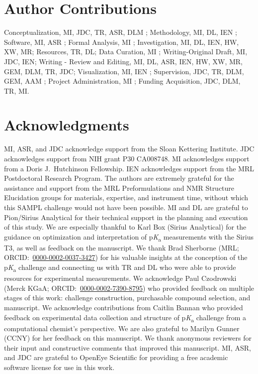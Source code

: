 \documentclass[9pt,lineno]{elife}
\newcommand{\pKa}{p\textit{K}\textsubscript{a}}
\begin{document}
\section{Author Contributions}

Conceptualization, MI, JDC, TR, ASR, DLM  ; Methodology, MI, DL, IEN ; Software, MI, ASR ; Formal Analysis, MI ; Investigation, MI, DL, IEN, HW, XW, MR; Resources, TR, DL;  Data Curation, MI ; Writing-Original Draft, MI, JDC, IEN; Writing - Review and Editing, MI, DL, ASR, IEN, HW, XW, MR, GEM, DLM, TR, JDC; Visualization, MI, IEN ; Supervision, JDC, TR, DLM, GEM, AAM ; Project Administration, MI ; Funding Acquisition, JDC, DLM, TR, MI. 


\section{Acknowledgments}

MI, ASR, and JDC acknowledge support from the Sloan Kettering Institute.
JDC acknowledges support from NIH grant P30 CA008748. 
MI acknowledges support from a Doris J.\ Hutchinson Fellowship. 
IEN acknowledges support from the MRL Postdoctoral Research Program.
The authors are extremely grateful for the assistance and support from the MRL Preformulations and NMR Structure Elucidation groups for materials, expertise, and instrument time, without which this SAMPL challenge would not have been possible.
MI and DL are grateful to Pion/Sirius Analytical for their technical support in the planning and execution of this study. 
We are especially thankful to Karl Box (Sirius Analytical) for the guidance on optimization and interpretation of \pKa{} measurements with the Sirius T3, as well as feedback on the manuscript. 
We thank Brad Sherborne (MRL; ORCID:~\href{https://orcid.org/0000-0002-0037-3427
}{0000-0002-0037-3427}) for his valuable insights at the conception of the \pKa{} challenge and connecting us with TR and DL who were able to provide resources for experimental measurements. 
We acknowledge Paul Czodrowski (Merck KGaA; ORCID:~\href{https://orcid.org/0000-0002-7390-8795}{0000-0002-7390-8795}) who provided feedback on multiple stages of this work: challenge construction, purchasable compound selection, and manuscript. 
We acknowledge contributions from Caitlin Bannan who provided feedback on experimental data collection and structure of \pKa{} challenge from a computational chemist's perspective. 
We are also grateful to Marilyn Gunner (CCNY) for her feedback on this manuscript.
We thank anonymous reviewers for their input and constructive comments that improved this manuscript.
MI, ASR, and JDC are grateful to OpenEye Scientific for providing a free academic software license for use in this work.
\end{document}

